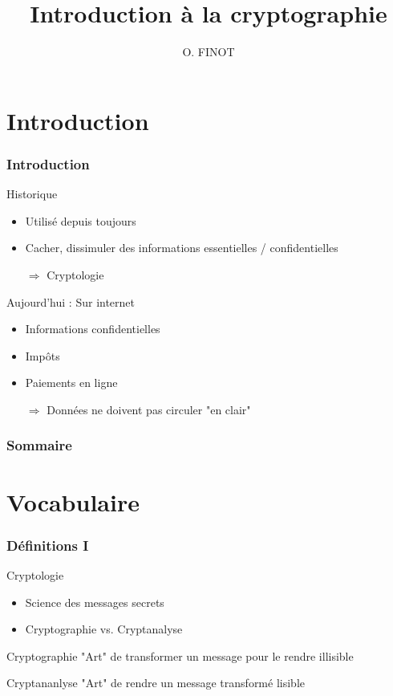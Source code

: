 \documentclass[xcolor={dvipsnames}]{beamer}
\title{Introduction à la cryptographie}
\author{O. FINOT}\institute{Lycée S$^t$ Vincent de Paul}
\begin{document}
\begin{frame}
  \titlepage 
\end{frame}

\section{Introduction}

\begin{frame}
\frametitle{Introduction}	
	
	\begin{block}{Historique}
		\begin{itemize}
			\item Utilisé depuis toujours
			\item Cacher, dissimuler des informations essentielles / confidentielles\pause
			\item[$\Rightarrow$] Cryptologie
		\end{itemize}	\pause
	\end{block}
	
	\begin{block}{Aujourd'hui : Sur internet}
		\begin{itemize}
			\item Informations confidentielles
			\item Impôts
			\item Paiements en ligne\pause
			\item[$\Rightarrow$] Données ne doivent pas circuler "en clair"
		\end{itemize}
	\end{block}
	
\end{frame}

\begin{frame}
	\frametitle{Sommaire}
	\tableofcontents[hideallsubsections]
\end{frame} 

\section{Vocabulaire}

\begin{frame}
\frametitle{Définitions I}


	\begin{alertblock}{Cryptologie}
		\begin{itemize}
			\item Science des messages secrets
			\item Cryptographie vs. Cryptanalyse
		\end{itemize}
	\end{alertblock}\pause
	
	\begin{block}{Cryptographie}
		"Art" de transformer un message pour le rendre illisible
	\end{block}\pause
	
	\begin{block}{Cryptananlyse}
		"Art" de rendre un message transformé lisible
	\end{block}
\end{frame}
\end{document}
